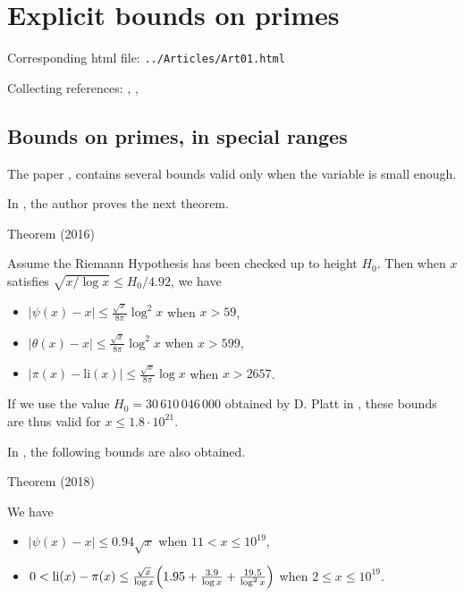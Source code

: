 \chapter{   Explicit bounds on primes}

Corresponding html file: \texttt{../Articles/Art01.html}










 
 


Collecting references:
\cite{Dusart*98},
\cite{Dusart*07},

\section{Bounds on primes, in special ranges}

The paper
\cite{Rosser-Schoenfeld*62},
contains several bounds valid only when the variable is small enough.

In 
\cite{Buthe*16},  the
author proves the next theorem.
\par 
\begin{thm}{Theorem (2016)}

    Assume the Riemann Hypothesis has been checked up to height
    $H_0$. Then when $x$ satisfies $\sqrt{x/\log x}\le H_0/4.92$, we have
  \begin{itemize}
    \item $|\psi(x)-x|\le \frac{\sqrt{x}}{8\pi}\log^2x$ when $x > 59$,

    \item $|\theta(x)-x|\le \frac{\sqrt{x}}{8\pi}\log^2x$ when $x > 599$,

    \item $|\pi(x)-\text{li}(x)|\le \frac{\sqrt{x}}{8\pi}\log x$ when
    $x > 2657$.

					\end{itemize}
\end{thm}

If we use the value $H_0=30\,610\,046\,000$ obtained by D. Platt
in
\cite{Platt*17}, these
bounds are thus valid for $x\le 1.8\cdot 10^{21}$.

In
\cite{Buthe*18},
the following bounds are also obtained.
\par 
\begin{thm}{Theorem (2018)}

    We have
  \begin{itemize}
    \item $|\psi(x)-x|\le 0.94\sqrt{x}$ when $11 < x\le 10^{19}$,

   \item $0<\text{li}(x)-\pi(x)\le\frac{\sqrt{x}}{\log
   x}\Bigl(1.95+\frac{3.9}{\log x}+\frac{19.5}{\log^2x}\Bigr)$  when
   $2\le x\le 10^{19}$.

\end{itemize}
\end{thm}



